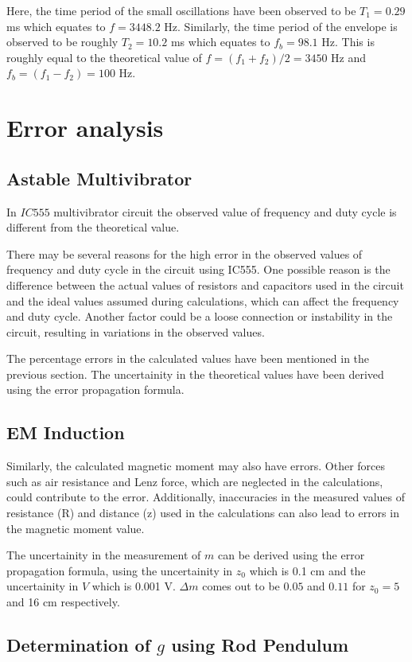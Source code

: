 Here, the time period of the small oscillations have been observed to be $T_1 = 0.29$ ms which equates to $f=3448.2$ Hz. Similarly, the time period of the envelope is observed to be roughly $T_2=10.2$ ms which equates to $f_b=98.1$ Hz. This is roughly equal to the theoretical value of $f=(f_1+f_2)/2=3450$ Hz and $f_b=(f_1-f_2)=100$ Hz.

\section{Error analysis}

\subsection{Astable Multivibrator}
In $IC 555$ multivibrator circuit the observed value of frequency and duty cycle is different from the theoretical value.

There may be several reasons for the high error in the observed values of frequency and duty cycle in the circuit using IC555. One possible reason is the difference between the actual values of resistors and capacitors used in the circuit and the ideal values assumed during calculations, which can affect the frequency and duty cycle. Another factor could be a loose connection or instability in the circuit, resulting in variations in the observed values.

The percentage errors in the calculated values have been mentioned in the previous section. The uncertainity in the theoretical values have been derived using the error propagation formula.

\subsection{EM Induction}
Similarly, the calculated magnetic moment may also have errors. Other forces such as air resistance and Lenz force, which are neglected in the calculations, could contribute to the error. Additionally, inaccuracies in the measured values of resistance (R) and distance (z) used in the calculations can also lead to errors in the magnetic moment value.

The uncertainity in the measurement of $m$ can be derived using the error propagation formula, using the uncertainity in $z_0$ which is 0.1 cm and the uncertainity in $V$ which is 0.001 V. $\Delta m$ comes out to be $0.05$ and $0.11$ for $z_0=5$ and 16 cm respectively.

\subsection{Determination of $g$ using Rod Pendulum}

